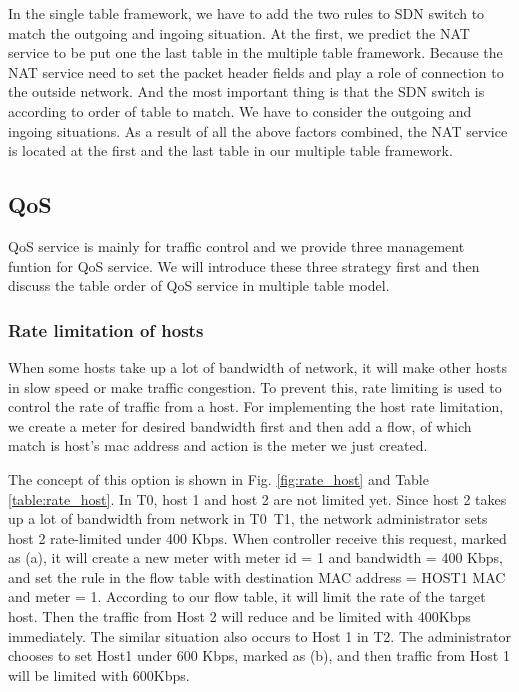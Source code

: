 \documentclass[journal]{IEEEtran}
\begin{document}
In the single table framework, we have to add the two rules to SDN switch to match the outgoing and ingoing situation.
At the first, we predict the NAT service to be put one the last table in the multiple table framework.
Because the NAT service need to set the packet header fields and play a role of connection to the outside network.
And the most important thing is that the SDN switch is according to order of table to match.
We have to consider the outgoing and ingoing situations.
As a result of all the above factors combined,
the NAT service is located at the first and the last table in our multiple table framework.

\subsection{QoS}
QoS service is mainly for traffic control and we provide three management funtion for QoS service. We will introduce these three strategy first and then discuss the table order of QoS service in multiple table model.

\subsubsection{Rate limitation of hosts}
When some hosts take up a lot of bandwidth of network, it will make other hosts in slow speed or make traffic congestion. To prevent this, rate limiting is used to control the rate of traffic from a host. For implementing the host rate limitation, we create a meter for desired bandwidth first and then add a flow, of which match is host’s mac address and action is the meter we just created.

The concept of this option is shown in Fig. \ref{fig:rate_host} and Table \ref{table:rate_host}. In T0, host 1 and host 2 are not limited yet. Since host 2 takes up a lot of bandwidth from network in T0~T1, the network administrator sets host 2 rate-limited under 400 Kbps. When controller receive this request, marked as (a), it will create a new meter  with meter id = 1 and bandwidth = 400 Kbps, and set the rule in the flow table with destination MAC address = HOST1 MAC and meter = 1. According to our flow table, it will limit the rate of the target host. Then the traffic from Host 2 will reduce and be limited with 400Kbps immediately. The similar situation also occurs to Host 1 in T2. The administrator chooses to set Host1 under 600 Kbps, marked as (b), and then traffic from Host 1 will be limited with 600Kbps.
\end{document}
